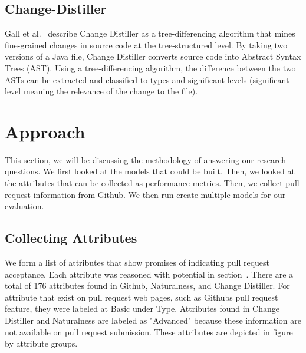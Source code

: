 \documentclass[10pt, conference]{IEEEtran}
\begin{document}
\subsection{Change-Distiller}
Gall et al.~\cite{Gall:2009:CAE:1495795.1495953} describe Change Distiller as a tree-differencing algorithm that mines fine-grained changes in source code at the tree-structured level. By taking two versions of a Java file, Change Distiller converts source code into Abstract Syntax Trees (AST). Using a tree-differencing algorithm, the difference between the two ASTs can be extracted and classified to types and significant levels (significant level meaning the relevance of the change to the file). 

\section{Approach}
\label{approach}
This section, we will be discussing the methodology of answering our research questions. We first looked at the models that could be built. Then, we looked at the attributes that can be collected as performance metrics. Then, we collect pull request information from Github. We then run create multiple models for our evaluation.

\subsection{Collecting Attributes}
We form a list of attributes that show promises of indicating pull request acceptance. Each attribute was reasoned with potential in section~\cite{background}. There are a total of 176 attributes found in Github, Naturalness, and Change Distiller. For attribute that exist on pull request web pages, such as Github\textquotesingle s pull request feature, they were labeled at Basic under Type. Attributes found in Change Distiller and Naturalness are labeled as "Advanced" because these information are not available on pull request submission. These attributes are depicted in figure ~\cite{figureListOfMetrics} by attribute groups.
\end{document}
